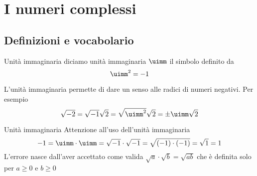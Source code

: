 \chapter{I numeri complessi}
\label{cha:INumeriComplessi}
\section{Definizioni e vocabolario}
\label{sec:NumCompDefinizioniVocabolario}
\begin{definizionet}{Unità immaginaria}{}
	diciamo unità immaginaria $\uimm$ il simbolo definito da \[\uimm^2=-1\]  
\end{definizionet}
L'unità immaginaria permette di dare un senso alle radici di numeri negativi. Per esempio \[\sqrt{-2}=\sqrt{-1}\sqrt{2}=\sqrt{\uimm^2}\sqrt{2}=\pm\uimm\sqrt{2}\]
\begin{cesempiot}{Unità immaginaria}{}
Attenzione all'uso dell'unità immaginaria
\[-1=\uimm\cdot\uimm=\sqrt{-1}\cdot\sqrt{-1}=\sqrt{(-1)\cdot(-1)}=\sqrt{1}=1 \]L'errore nasce dall'aver accettato come valida $\sqrt{a}\cdot\sqrt{b}=\sqrt{ab}$ che è definita solo per $a\geq 0$ e $b\geq 0$
\end{cesempiot}
